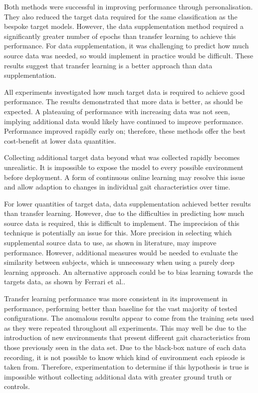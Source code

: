 Both methods were successful in improving performance through personalisation. They also reduced the target data required for the same classification as the bespoke target models. However, the data supplementation method required a significantly greater number of epochs than transfer learning to achieve this performance. For data supplementation, it was challenging to predict how much source data was needed, so would implement in practice would be difficult. These results suggest that transfer learning is a better approach than data supplementation.

All experiments investigated how much target data is required to achieve good performance. The results demonstrated that more data is better, as should be expected. A plateauing of performance with increasing data was not seen, implying additional data would likely have continued to improve performance. Performance improved rapidly early on; therefore, these methods offer the best cost-benefit at lower data quantities.

Collecting additional target data beyond what was collected rapidly becomes unrealistic. It is impossible to expose the model to every possible environment before deployment. A form of continuous online learning may resolve this issue and allow adaption to changes in individual gait characteristics over time.

For lower quantities of target data, data supplementation achieved better results than transfer learning. However, due to the difficulties in predicting how much source data is required, this is difficult to implement. The imprecision of this technique is potentially an issue for this. More precision in selecting which supplemental source data to use, as shown in literature, may improve performance. However, additional measures would be needed to evaluate the similarity between subjects, which is unnecessary when using a purely deep learning approach. An alternative approach could be to bias learning towards the targets data, as shown by Ferrari et al.\cite{Ferrari2020}.

Transfer learning performance was more consistent in its improvement in performance, performing better than baseline for the vast majority of tested configurations. The anomalous results appear to come from the training sets used as they were repeated throughout all experiments. This may well be due to the introduction of new environments that present different gait characteristics from those previously seen in the data set. Due to the black-box nature of each data recording, it is not possible to know which kind of environment each episode is taken from. Therefore, experimentation to determine if this hypothesis is true is impossible without collecting additional data with greater ground truth or controls.

